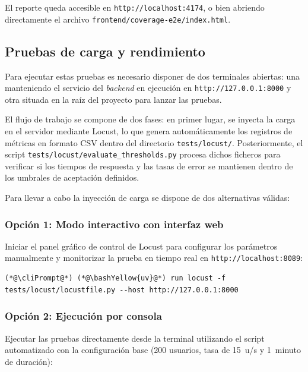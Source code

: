 \begin{appendices}
El reporte queda accesible en \texttt{http://localhost:4174}, o bien abriendo directamente el archivo \texttt{frontend/coverage-e2e/index.html}.

\subsection*{Pruebas de carga y rendimiento}

Para ejecutar estas pruebas es necesario disponer de dos terminales abiertas: una manteniendo el servicio del \textit{backend} en ejecución en \texttt{http://127.0.0.1:8000} y otra situada en la raíz del proyecto para lanzar las pruebas.

El flujo de trabajo se compone de dos fases: en primer lugar, se inyecta la carga en el servidor mediante Locust, lo que genera automáticamente los registros de métricas en formato CSV dentro del directorio \texttt{tests/locust/}. Posteriormente, el script \texttt{tests/locust/evaluate\_thresholds.py} procesa dichos ficheros para verificar si los tiempos de respuesta y las tasas de error se mantienen dentro de los umbrales de aceptación definidos.

Para llevar a cabo la inyección de carga se dispone de dos alternativas válidas:

\subsubsection*{Opción 1: Modo interactivo con interfaz web}

Iniciar el panel gráfico de control de Locust para configurar los parámetros manualmente y monitorizar la prueba en tiempo real en \texttt{http://localhost:8089}:

\begin{lstlisting}[basicstyle=\fontsize{11.5pt}{13.2pt}\ttfamily\color{black}, aboveskip=4pt, belowskip=4pt]
(*@\cliPrompt@*) (*@\bashYellow{uv}@*) run locust -f tests/locust/locustfile.py --host http://127.0.0.1:8000
\end{lstlisting}

\subsubsection*{Opción 2: Ejecución por consola}

Ejecutar las pruebas directamente desde la terminal utilizando el script automatizado con la configuración base (200 usuarios, tasa de 15~u/s y 1~minuto de duración):


\end{appendices}
